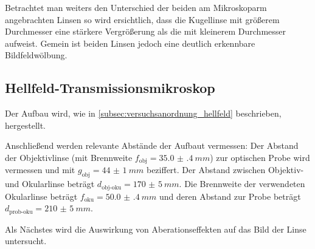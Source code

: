 \documentclass[ngerman]{scrartcl}
\begin{document}
\setcaphanging
%
Betrachtet man weiters den Unterschied der beiden am Mikroskoparm angebrachten Linsen so wird ersichtlich, dass die Kugellinse mit größerem Durchmesser eine stärkere Vergrößerung als die mit kleinerem Durchmesser aufweist. Gemein ist beiden Linsen jedoch eine deutlich erkennbare Bildfeldwölbung.


\subsection{Hellfeld-Transmissionsmikroskop}
\label{subsec:durchfuehrung_hellfeld}

Der Aufbau wird, wie in \autoref{subsec:versuchsanordnung_hellfeld} beschrieben, hergestellt.

Anschließend werden relevante Abstände der Aufbaut vermessen: Der Abstand der Objektivlinse (mit Brennweite $f_{\text{obj}}=\SI{35.0(4)}{mm}$) zur optischen Probe wird vermessen und mit $g_{\text{obj}}=\SI{44(1)}{mm}$ beziffert. Der Abstand zwischen Objektiv- und Okularlinse beträgt $d_{\text{obj-oku}}=\SI{170(5)}{mm}$. Die Brennweite der verwendeten Okularlinse beträgt $f_{\text{oku}}=\SI{50.0(4)}{mm}$ und deren Abstand zur Probe beträgt $d_{\text{prob-oku}}=\SI{210(5)}{mm}$.

Als Nächstes wird die Auswirkung von Aberationseffekten auf das Bild der Linse untersucht.
\end{document}
